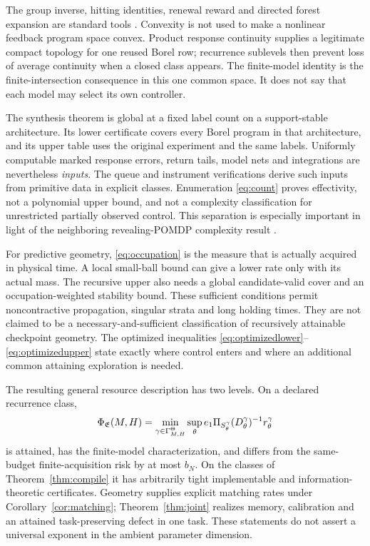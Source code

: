 The group inverse, hitting identities, renewal reward and directed forest expansion are standard tools \cite{Meyer,Asmussen,ChebotarevAgaev}. Convexity is not used to make a nonlinear feedback program space convex. Product response continuity supplies a legitimate compact topology for one reused Borel row; recurrence sublevels then prevent loss of average continuity when a closed class appears. The finite-model identity is the finite-intersection consequence in this one common space. It does not say that each model may select its own controller.

The synthesis theorem is global at a fixed label count on a support-stable architecture. Its lower certificate covers every Borel program in that architecture, and its upper table uses the original experiment and the same labels. Uniformly computable marked response errors, return tails, model nets and integrations are nevertheless \emph{inputs}. The queue and instrument verifications derive such inputs from primitive data in explicit classes. Enumeration \eqref{eq:count} proves effectivity, not a polynomial upper bound, and not a complexity classification for unrestricted partially observed control. This separation is especially important in light of the neighboring revealing-POMDP complexity result \cite{ACL}.

For predictive geometry, \eqref{eq:occupation} is the measure that is actually acquired in physical time. A local small-ball bound can give a lower rate only with its actual mass. The recursive upper also needs a global candidate-valid cover and an occupation-weighted stability bound. These sufficient conditions permit noncontractive propagation, singular strata and long holding times. They are not claimed to be a necessary-and-sufficient classification of recursively attainable checkpoint geometry. The optimized inequalities \eqref{eq:optimizedlower}--\eqref{eq:optimizedupper} state exactly where control enters and where an additional common attaining exploration is needed.

The resulting general resource description has two levels. On a declared recurrence class,
\[
 \Phi_{\mathfrak E}(M,H)
 =\min_{\gamma\in\Gamma_{M,H}^\Theta}\sup_\theta
     e_1\Pi_{S_\theta^\gamma}(D_\theta^\gamma)^{-1}r_\theta^\gamma
\]
is attained, has the finite-model characterization, and differs from the same-budget finite-acquisition risk by at most $b_N$. On the classes of Theorem~\ref{thm:compile} it has arbitrarily tight implementable and information-theoretic certificates. Geometry supplies explicit matching rates under Corollary~\ref{cor:matching}; Theorem~\ref{thm:joint} realizes memory, calibration and an attained task-preserving defect in one task. These statements do not assert a universal exponent in the ambient parameter dimension.

